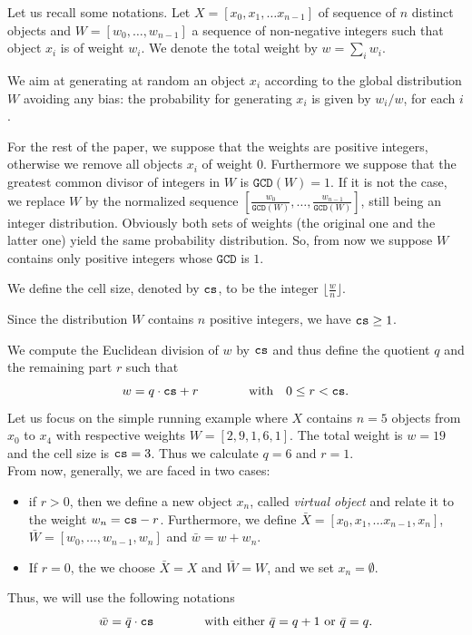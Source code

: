 
Let us recall some notations.
Let $X = [x_0, x_1, \dots x_{n-1}]$ of sequence of $n$ distinct objects and 
$W =[w_0, \dots, w_{n-1}]$ a sequence of non-negative integers such that 
object $x_i$ is of weight $w_i$. We denote the total weight by $w = \sum_i w_i$.

We aim at generating at random an object $x_i$
according to the global distribution $W$ avoiding any bias: the probability for generating $x_i$ is given 
by $w_i / w$, for each $i$.

For the rest of the paper, we suppose 
that the weights are positive integers, otherwise we remove all objects $x_i$
of weight $0$. Furthermore we suppose that the greatest common divisor of integers in $W$ is $\texttt{GCD}(W) = 1$.
If it is not the case, we replace $W$ by the normalized sequence 
$[\frac{w_0}{\texttt{GCD}(W)}, \dots, \frac{w_{n-1}}{\texttt{GCD}(W)}]$,
still being an integer distribution. 
Obviously both sets of weights (the original one and the latter one) yield the same probability distribution. 
So, from now we suppose $W$ contains only positive integers whose $\texttt{GCD}$ is $1$.

\begin{definition}
    We define the cell size, denoted by $\texttt{cs}$, to be the integer $\lfloor \frac{w}{n} \rfloor$.
\end{definition}

\begin{remark*}
    Since the distribution $W$ contains $n$ positive integers, we have $\texttt{cs} \geq 1$.
\end{remark*}

We compute the Euclidean division of $w$ by $\texttt{cs}$ and thus define the quotient $q$ and the remaining part $r$ such that
\begin{equation}
    \label{eq:division}
    w = q \cdot \texttt{cs} + r \qquad\qquad \text{with} \quad 0 \leq r < \texttt{cs}.
\end{equation}
Let us focus on the simple running example where $X$ contains $n=5$ objects from $x_0$ to $x_4$ 
with respective weights $W = [2, 9, 1, 6, 1]$.
The total weight is $w = 19$ and the cell size is $\texttt{cs} = 3$. Thus we calculate $q = 6$ and $r=1$.\\
From now, generally, we are faced in two cases:
\begin{itemize}
    \item if $r > 0$, then we define a new object $x_n$, called \emph{virtual object}
        and relate it to the weight $w_n = \texttt{cs} - r$.
        Furthermore, we define $\bar{X} = [x_0, x_1, \dots x_{n-1}, x_n]$, 
        $\bar{W} =[w_0, \dots, w_{n-1}, w_n]$ and $\bar{w} = w + w_n$.
    \item If $r=0$, the we choose $\bar{X} = X$ and $\bar{W} = W$, and we set $x_n=\emptyset$.
\end{itemize}
Thus, we will use the following notations
\begin{equation}
    \label{eq:division2}
    \bar{w} = \bar{q} \cdot \texttt{cs} \qquad\qquad \text{with either } \bar{q}=q+1 \text{ or } \bar{q}=q.
\end{equation}


